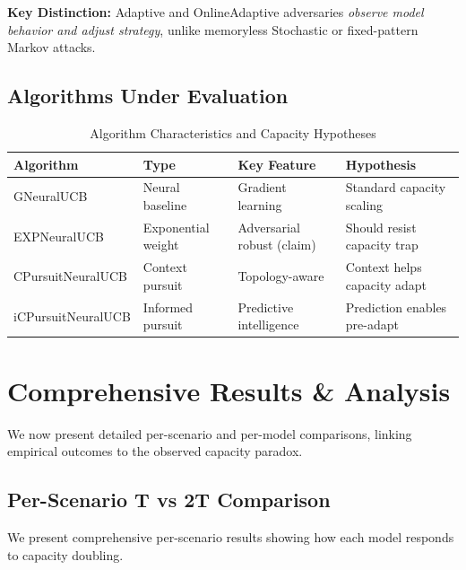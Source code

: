 \documentclass[11pt,a4paper]{article}
\begin{document}
\textbf{Key Distinction:} Adaptive and OnlineAdaptive adversaries \textit{observe model behavior and adjust strategy}, unlike memoryless Stochastic or fixed-pattern Markov attacks.

\subsection{Algorithms Under Evaluation}

\vspace{-0.2cm}

\begin{table}[h]
\scriptsize
\centering
\begin{tabular}{llll}
\toprule
\textbf{Algorithm} & \textbf{Type} & \textbf{Key Feature} & \textbf{Hypothesis} \\
\midrule
GNeuralUCB & Neural baseline & Gradient learning & Standard capacity scaling \\
EXPNeuralUCB & Exponential weight & Adversarial robust (claim) & Should resist capacity trap \\
CPursuitNeuralUCB & Context pursuit & Topology-aware & Context helps capacity adapt \\
iCPursuitNeuralUCB & Informed pursuit & Predictive intelligence & Prediction enables pre-adapt \\
\bottomrule
\end{tabular}
\vspace{-0.2cm}
\caption{Algorithm Characteristics and Capacity Hypotheses}
\end{table}

\section{Comprehensive Results \& Analysis}

We now present detailed per-scenario and per-model comparisons, linking empirical outcomes to the observed capacity paradox.

\subsection{Per-Scenario T vs 2T Comparison}

We present comprehensive per-scenario results showing how each model responds to capacity doubling.
\end{document}
